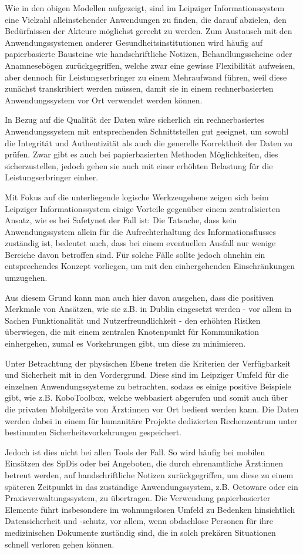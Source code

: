 Wie in den obigen Modellen aufgezeigt, sind im Leipziger Informationssystem eine Vielzahl alleinstehender Anwendungen zu finden, die darauf abzielen, den Bedürfnissen der Akteure möglichst gerecht zu werden. Zum Austausch mit den Anwendungssystemen anderer Gesundheitsinstitutionen wird häufig auf papierbasierte Bausteine wie handschriftliche Notizen, Behandlungsscheine oder Anamnesebögen zurückgegriffen, welche zwar eine gewisse Flexibilität aufweisen, aber dennoch für Leistungserbringer zu einem Mehraufwand führen, weil diese zunächst transkribiert werden müssen, damit sie in einem rechnerbasierten Anwendungssystem vor Ort verwendet werden können.

In Bezug auf die Qualität der Daten wäre sicherlich ein rechnerbasiertes Anwendungssystem mit entsprechenden Schnittstellen gut geeignet, um sowohl die Integrität und Authentizität als auch die generelle Korrektheit der Daten zu prüfen. Zwar gibt es auch bei papierbasierten Methoden Möglichkeiten, dies sicherzustellen, jedoch gehen sie auch mit einer erhöhten Belastung für die Leistungserbringer einher.

Mit Fokus auf die unterliegende logische Werkzeugebene zeigen sich beim Leipziger Informationssystem einige Vorteile gegenüber einem zentralisierten Ansatz, wie es bei Safetynet der Fall ist: Die Tatsache, dass kein Anwendungssystem allein für die Aufrechterhaltung des Informationsflusses zuständig ist, bedeutet auch, dass bei einem eventuellen Ausfall nur wenige Bereiche davon betroffen sind. Für solche Fälle sollte jedoch ohnehin ein entsprechendes Konzept vorliegen, um mit den einhergehenden Einschränkungen umzugehen.

Aus diesem Grund kann man auch hier davon ausgehen, dass die positiven Merkmale von Ansätzen, wie sie z.B. in Dublin eingesetzt werden - vor allem in Sachen Funktionalität und Nutzerfreundlichkeit - den erhöhten Risiken überwiegen, die mit einem zentralen Knotenpunkt für Kommunikation einhergehen, zumal es Vorkehrungen gibt, um diese zu minimieren.

Unter Betrachtung der physischen Ebene treten die Kriterien der Verfügbarkeit und Sicherheit mit in den Vordergrund. Diese sind im Leipziger Umfeld für die einzelnen Anwendungssysteme zu betrachten, sodass es einige positive Beispiele gibt, wie z.B. KoboToolbox, welche webbasiert abgerufen und somit auch über die privaten Mobilgeräte von Ärzt:innen vor Ort bedient werden kann. Die Daten werden dabei in einem für humanitäre Projekte dedizierten Rechenzentrum unter bestimmten Sicherheitsvorkehrungen gespeichert.

Jedoch ist dies nicht bei allen Tools der Fall. So wird häufig bei mobilen Einsätzen des \acp{SpDi} oder bei Angeboten, die durch ehrenamtliche Ärzt:innen betreut werden, auf handschriftliche Notizen zurückgegriffen, um diese zu einem späteren Zeitpunkt in das zuständige Anwendungssystem, z.B. Octoware oder ein Praxisverwaltungssystem, zu übertragen. Die Verwendung papierbasierter Elemente führt insbesondere im wohnungslosen Umfeld zu Bedenken hinsichtlich Datensicherheit und -schutz, vor allem, wenn obdachlose Personen für ihre medizinischen Dokumente zuständig sind, die in solch prekären Situationen schnell verloren gehen können.